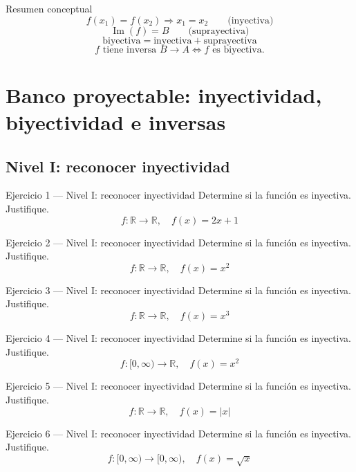 \documentclass[aspectratio=169,10pt]{beamer}
\begin{document}
\begin{frame}{Resumen conceptual}
\[
\boxed{f(x_1)=f(x_2)\Rightarrow x_1=x_2}\qquad\text{(inyectiva)}
\]
\[
\boxed{\operatorname{Im}(f)=B}\qquad\text{(suprayectiva)}
\]
\[
\boxed{\text{biyectiva}=\text{inyectiva}+\text{suprayectiva}}
\]
\[
\boxed{f\text{ tiene inversa }B\to A\iff f\text{ es biyectiva}.}
\]
\end{frame}

\section{Banco proyectable: inyectividad, biyectividad e inversas}
\subsection{Nivel I: reconocer inyectividad}
\begin{frame}{Ejercicio 1 — Nivel I: reconocer inyectividad}
Determine si la función es inyectiva. Justifique.
\[
f:\mathbb{R}\to\mathbb{R},\quad f(x)=2x+1
\]
\end{frame}

\begin{frame}{Ejercicio 2 — Nivel I: reconocer inyectividad}
Determine si la función es inyectiva. Justifique.
\[
f:\mathbb{R}\to\mathbb{R},\quad f(x)=x^2
\]
\end{frame}

\begin{frame}{Ejercicio 3 — Nivel I: reconocer inyectividad}
Determine si la función es inyectiva. Justifique.
\[
f:\mathbb{R}\to\mathbb{R},\quad f(x)=x^3
\]
\end{frame}

\begin{frame}{Ejercicio 4 — Nivel I: reconocer inyectividad}
Determine si la función es inyectiva. Justifique.
\[
f:[0,\infty)\to\mathbb{R},\quad f(x)=x^2
\]
\end{frame}

\begin{frame}{Ejercicio 5 — Nivel I: reconocer inyectividad}
Determine si la función es inyectiva. Justifique.
\[
f:\mathbb{R}\to\mathbb{R},\quad f(x)=|x|
\]
\end{frame}

\begin{frame}{Ejercicio 6 — Nivel I: reconocer inyectividad}
Determine si la función es inyectiva. Justifique.
\[
f:[0,\infty)\to[0,\infty),\quad f(x)=\sqrt{x}
\]
\end{frame}
\end{document}
